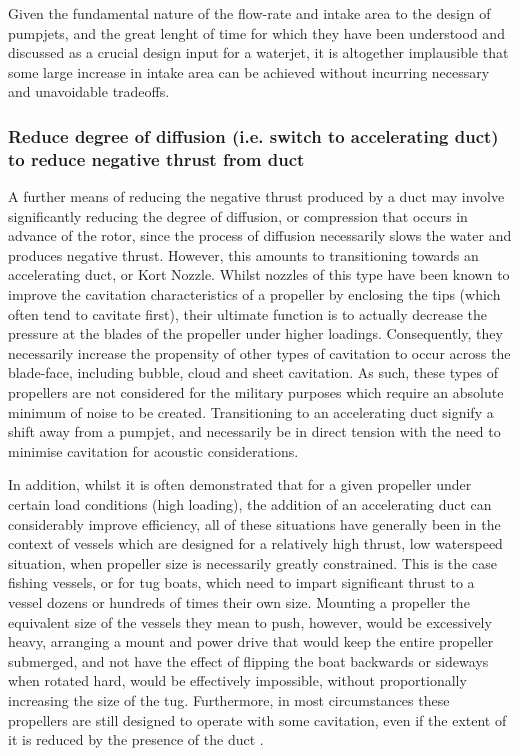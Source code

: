 \documentclass{article}\usepackage[]{graphicx}\usepackage[]{color}
\begin{document}
Given the fundamental nature of the flow-rate and intake area to the design of pumpjets, and the great lenght of time for which they have been understood and discussed as a crucial design input for a waterjet, it is altogether implausible that some large increase in intake area can be achieved without incurring necessary and unavoidable tradeoffs.

\subsubsection{Reduce degree of diffusion (i.e. switch to accelerating duct) to reduce negative thrust from duct}
A further means of reducing the negative thrust produced by a duct may involve significantly reducing the degree of diffusion, or compression that occurs in advance of the rotor, since the process of diffusion necessarily slows the water and produces negative thrust.  However, this amounts to transitioning towards an accelerating duct, or Kort Nozzle. Whilst nozzles of this type have been known to improve the cavitation characteristics of a propeller by enclosing the tips (which often tend to cavitate first), their ultimate function is to actually decrease the pressure at the blades of the propeller under higher loadings.  Consequently, they necessarily increase the propensity of other types of cavitation to occur across the blade-face, including bubble, cloud and sheet cavitation. As such, these types of propellers are not considered for the military purposes which require an absolute minimum of noise to be created.  Transitioning to an accelerating duct signify a shift away from a pumpjet, and necessarily be in direct tension with the need to minimise cavitation for acoustic considerations.

In addition, whilst it is often demonstrated that for a given propeller under certain load conditions (high loading), the addition of an accelerating duct can considerably improve efficiency, all of these situations have generally been in the context of vessels which are designed for a relatively high thrust, low waterspeed situation, when propeller size is necessarily greatly constrained.  This is the case fishing vessels, or for tug boats, which need to impart significant thrust to a vessel dozens or hundreds of times their own size.  Mounting a propeller the equivalent size of the vessels they mean to push, however, would be excessively heavy, arranging a mount and power drive that would keep the entire propeller submerged, and not have the effect of flipping the boat backwards or sideways when rotated hard, would be effectively impossible, without proportionally increasing the size of the tug. Furthermore, in most circumstances these propellers are still designed to operate with some cavitation, even if the extent of it is reduced by the presence of the duct \parencite{haimov2010}.
\end{document}
